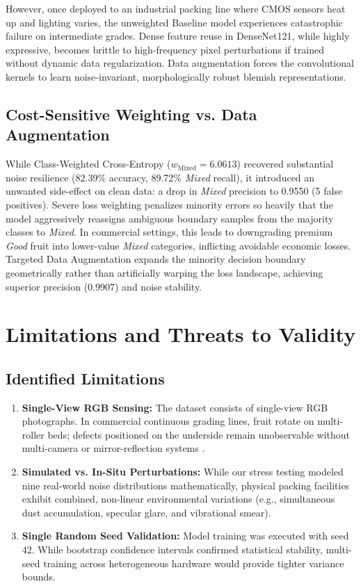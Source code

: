 \documentclass[conference]{IEEEtran}
\begin{document}
However, once deployed to an industrial packing line where CMOS sensors heat up and lighting varies, the unweighted Baseline model experiences catastrophic failure on intermediate grades. Dense feature reuse in DenseNet121, while highly expressive, becomes brittle to high-frequency pixel perturbations if trained without dynamic data regularization. Data augmentation forces the convolutional kernels to learn noise-invariant, morphologically robust blemish representations.

\subsection{Cost-Sensitive Weighting vs. Data Augmentation}
While Class-Weighted Cross-Entropy ($w_{\text{Mixed}}=6.0613$) recovered substantial noise resilience (82.39\% accuracy, 89.72\% \textit{Mixed} recall), it introduced an unwanted side-effect on clean data: a drop in \textit{Mixed} precision to 0.9550 (5 false positives). Severe loss weighting penalizes minority errors so heavily that the model aggressively reassigns ambiguous boundary samples from the majority classes to \textit{Mixed}. In commercial settings, this leads to downgrading premium \textit{Good} fruit into lower-value \textit{Mixed} categories, inflicting avoidable economic losses. Targeted Data Augmentation expands the minority decision boundary geometrically rather than artificially warping the loss landscape, achieving superior precision (0.9907) and noise stability.

\section{Limitations and Threats to Validity}
\subsection{Identified Limitations}
\begin{enumerate}
    \item \textbf{Single-View RGB Sensing:} The dataset consists of single-view RGB photographs. In commercial continuous grading lines, fruit rotate on multi-roller beds; defects positioned on the underside remain unobservable without multi-camera or mirror-reflection systems \cite{cubero2011review}.
    \item \textbf{Simulated vs. In-Situ Perturbations:} While our stress testing modeled nine real-world noise distributions mathematically, physical packing facilities exhibit combined, non-linear environmental variations (e.g., simultaneous dust accumulation, specular glare, and vibrational smear).
    \item \textbf{Single Random Seed Validation:} Model training was executed with seed 42. While bootstrap confidence intervals confirmed statistical stability, multi-seed training across heterogeneous hardware would provide tighter variance bounds.
\end{enumerate}
\end{document}
